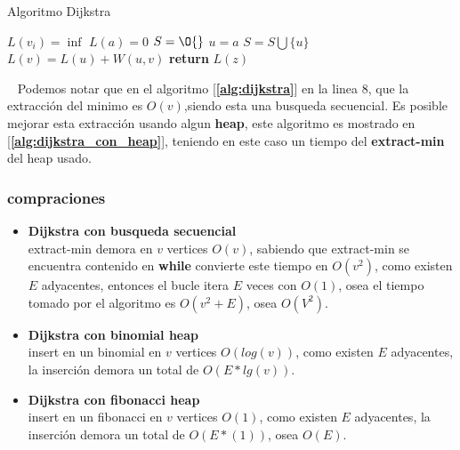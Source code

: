 \documentclass[a4paper,twocolumn,10pt]{article}
\begin{document}
\begin{algorithm}
\caption{Algoritmo Dijkstra}\label{alg:dijkstra}
\begin{algorithmic}
      \State $L(v_i)=\inf$ 
      \EndFor
    \State $L(a)=0$
    \State $S=\O{}$
     
      \State $u=a$  
      \State $S=S \bigcup \{u\}$
       
	    \State $L(v)=L(u)+W(u,v)$
	 \EndIf
	 \EndFor
    \EndWhile 
    \State \textbf{return} $L(z)$
\EndProcedure 
\end{algorithmic}
\end{algorithm}

~\newline 
Podemos notar que en el algoritmo [\textbf{\ref{alg:dijkstra}}] en la linea \textbf{$8$}, que la extracción
del minimo es \textbf{$O(v)$},siendo esta una busqueda secuencial. Es posible mejorar esta extracción usando algun \textbf{heap},
este algoritmo es mostrado en [\textbf{\ref{alg:dijkstra_con_heap}}], teniendo en este caso un tiempo del \textbf{extract-min}
del heap usado.

\subsubsection{compraciones}
\begin{itemize}
  \item \textbf{Dijkstra con busqueda secuencial}\\
	extract-min demora en $v$ vertices $O(v)$, sabiendo que extract-min se encuentra contenido en \textbf{while}
	convierte  este tiempo en $O(v^2)$, como existen $E$ adyacentes, entonces el bucle itera $E$ veces con $O(1)$,
	osea el tiempo tomado por el algoritmo es $O(v^2 + E)$, osea $O(V^2)$.
  \item \textbf{Dijkstra con binomial heap}\\
	insert en un binomial en $v$ vertices $O(log(v))$, como existen $E$ adyacentes, la inserción demora un total de
	$O(E*lg(v))$.
  \item \textbf{Dijkstra con fibonacci heap}\\
	insert en un fibonacci en $v$ vertices $O(1)$, como existen $E$ adyacentes, la inserción demora un total de
	$O(E*(1))$, osea $O(E)$.
\end{itemize}
\end{document}
